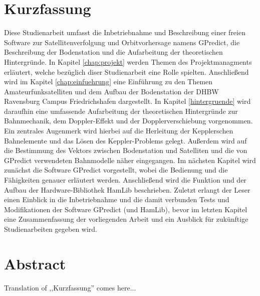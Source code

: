 
\chapter*{Kurzfassung}
Diese Studienarbeit umfasst die Inbetriebnahme und Beschreibung einer freien Software zur Satellitenverfolgung und Orbitvorhersage namens GPredict, die Beschreibung der Bodenstation und die Aufarbeitung der theoretischen Hintergründe.\newpar
In Kapitel \ref{chap:projekt} werden Themen des Projektmanagments erläutert, welche bezüglich diser Studienarbeit eine Rolle spielten. Anschließend wird im Kapitel \ref{chap:einfuehrung} eine Einführung zu den Themen Amateurfunksatelliten und dem Aufbau der Bodenstation der \ac{DHBW} Ravensburg Campus Friedrichshafen dargestellt.\newpar
In Kapitel \ref{hintergruende} wird daraufhin eine umfassende Aufarbeitung der theoretischen Hintergründe zur Bahnmechanik, dem Doppler-Effekt und der Dopplerverschiebung vorgenommen. Ein zentrales Augenmerk wird hierbei auf die Herleitung der Kepplerschen Bahnelemente und das Lösen des Keppler-Problems gelegt. Außerdem wird auf die Bestimmung des Vektors zwischen Bodenstation und Satelliten und die von GPredict verwendeten Bahnmodelle näher eingegangen.\newpar
Im nächsten Kapitel wird zunächst die Software GPredict vorgestellt, wobei die Bedienung und die Fähigkeiten genauer erläutert werden. Anschließend wird die Funktion und der Aufbau der Hardware-Bibliothek HamLib beschrieben. Zuletzt erlangt der Leser einen Einblick in die Inbetriebnahme und die damit verbunden Tests und Modifikationen der Software GPredict (und HamLib), bevor im letzten Kapitel eine Zusammenfassung der vorliegenden Arbeit und ein Ausblick für zukünftige Studienarbeiten gegeben wird.

\chapter*{Abstract}

\iffalse
\vspace{3em}
\begin{Huge}
	\textbf{Abstract}
\end{Huge}
\vspace{1.5em}
\fi

Translation of ,,Kurzfassung'' comes here...